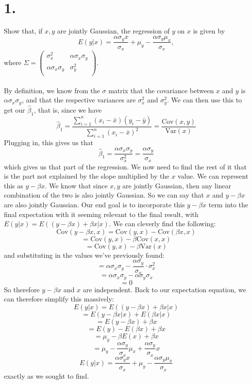 \documentclass{article}
\begin{document}
\thispagestyle{firstpageheader}
{\Large 

\section*{1.}
Show that, if \(x, y\) are jointly Gaussian, the regression of \(y\) on \(x\) is given by 
\[
  E(y | x) = \frac{\alpha \sigma_y x}{\sigma_x} + \mu_y - \frac{\alpha \sigma_y \mu_x}{\sigma_x}, 
\]
where \(\Sigma = \begin{pmatrix}
\sigma^2_x & \alpha \sigma_x \sigma_y \\
\alpha \sigma_x \sigma_y & \sigma_y^2 \\
\end{pmatrix}.\) \\ \\
By definition, we know from the \(\sigma\) matrix that the covariance between \(x\) and \(y\) is \(\alpha \sigma_x \sigma_y\), and that the respective variances are \(\sigma_x^2\) and \(\sigma_y^2\). We can then use this to get our \(\hat{\beta}_1\), that is, since we have 
\[
  \hat{\beta}_1 = \frac{\sum_{i=1}^{n} (x_i - \bar{x}) (y_i - \bar{y})}{\sum_{i=1}^{n} (x_i - \bar{x})^2} = \frac{\text{Cov}(x, y)}{\text{Var}(x)}
\] 
Plugging in, this gives us that 
\[
  \hat{\beta}_1 = \frac{\alpha \sigma_x \sigma_y}{\sigma_x^2} = \frac{\alpha \sigma_y}{\sigma_x}
\]
which gives us that part of the regression. We now need to find the rest of it that is the part not explained by the slope multiplied by the \(x\) value. We can represent this as \(y - \beta x\). We know that since \(x, y\) are jointly Gaussian, then any linear combination of the two is also jointly Gaussian. So we can say that \(x\) and \(y - \beta x\) are also jointly Gaussian. Our end goal is to incorporate this \(y - \beta x\) term into the final expectation with it seeming relevant to the final result, with \(E(y | x) = E((y - \beta x) + \beta x | x)\). We can cleverly find the following: 
\[
  \text{Cov}(y - \beta x, x) = \text{Cov}(y, x) - \text{Cov}(\beta x, x)
\]
\[
  = \text{Cov}(y, x) - \beta \text{Cov}(x, x)
\]
\[
  = \text{Cov}(y, x) - \beta \text{Var}(x)
\]
and substituting in the values we've previously found:
\[
  = \alpha \sigma_x \sigma_y - \frac{\alpha \sigma_y}{\sigma_x} \cdot \sigma_x^2
\]
\[
  = \alpha \sigma_x \sigma_y - \alpha \sigma_y \sigma_x
\]
\[
  = 0
\]
So therefore \(y - \beta x\) and \(x\) are independent. Back to our expectation equation, we can therefore simplify this massively:
\[
  E(y | x) = E((y - \beta x) + \beta x | x)
\]
\[
  = E(y - \beta x | x) + E(\beta x | x)
\]
\[
  = E(y - \beta x) + \beta x
\]
\[
  = E(y) - E(\beta x) + \beta x
\]
\[
  = \mu_y - \beta E(x) + \beta x
\]
\[
  = \mu_y - \frac{\alpha \sigma_y}{\sigma_x} \mu_x + \frac{\alpha \sigma_y}{\sigma_x} x
\]
\[
  E(y | x) = \frac{\alpha \sigma_y x}{\sigma_x} + \mu_y - \frac{\alpha \sigma_y \mu_x}{\sigma_x} 
\]
exactly as we sought to find. 

}
\end{document}
